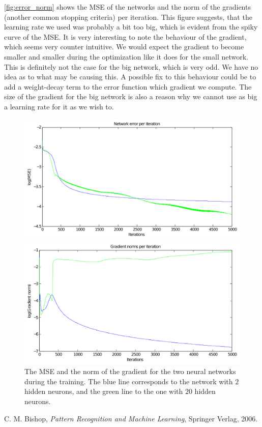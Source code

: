 \documentclass[11pt,a4paper]{article}
\begin{document}
\autoref{fig:error_norm} shows the MSE of the networks and the
norm of the gradients (another common stopping criteria) per iteration. This
figure suggests, that the learning rate we used was probably a bit too big,
which is evident from the spiky curve of the MSE. It is very interesting to
note the behaviour of the gradient, which seems very counter intuitive. We
would expect the gradient to become smaller and smaller during the
optimization like it does for the small network. This is definitely not the
case for the big network, which is very odd. We
have no idea as to what may be causing this. A possible fix to this behaviour
could be to add a weight-decay term to the error function which gradient we
compute. The size of the gradient for the big network is also a reason why we
cannot use as big a learning rate for it as we wish to.

\begin{figure}[htbp]
    \centering
    \begin{minipage}[b]{\linewidth}
        \centering
        \includegraphics[width=\textwidth]{figures/errors.pdf}
    \end{minipage}

    \begin{minipage}[b]{\linewidth}
        \centering
        \includegraphics[width=\textwidth]{figures/norms.pdf}
    \end{minipage}
    \caption{The MSE and the norm of the gradient for the two neural networks
        during the training. The blue line corresponds to the network with $2$
    hidden neurons, and the green line to the one with $20$ hidden neurons.}
    \label{fig:error_norm}
\end{figure}


\begin{thebibliography}{9}
        C. M. Bishop,
        \emph{Pattern Recognition and Machine Learning},
        Springer Verlag,
        2006.
\end{thebibliography}
\end{document}
